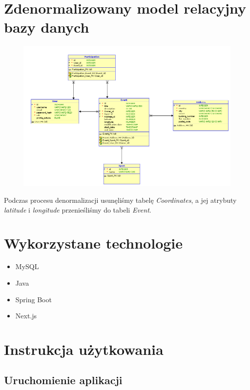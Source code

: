 \documentclass[11pt,a4paper]{article}
\begin{document}
\section{Zdenormalizowany model relacyjny bazy danych}

\begin{figure} [H]
    \centering
    \includegraphics[width=0.95\linewidth]{../model/model_denorm.png}
\end{figure}

Podczas procesu denormalizacji usunęliśmy tabelę \textit{Coordinates}, a jej atrybuty \textit{latitude} i \textit{longitude} przenieśliśmy do tabeli \textit{Event}.

\section{Wykorzystane technologie}

\begin{itemize}
    \item MySQL
    \item Java
    \item Spring Boot
    \item Next.js
\end{itemize}

\section{Instrukcja użytkowania}

\subsection{Uruchomienie aplikacji}
\end{document}
